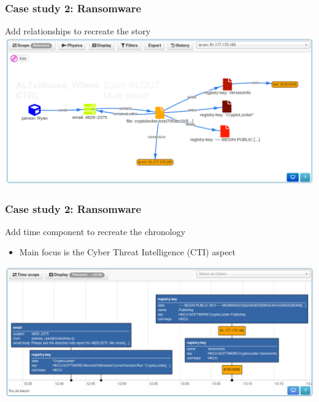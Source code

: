 \begin{frame}
    \frametitle{Case study 2: Ransomware}
    Add relationships to recreate the story
    \includegraphics[width=1.0\linewidth]{pictures/case2/event-graph.png}
\end{frame}

\begin{frame}
    \frametitle{Case study 2: Ransomware}
    Add time component to recreate the chronology
    \begin{itemize}
        \item Main focus is the Cyber Threat Intelligence (CTI) aspect
    \end{itemize}
    \includegraphics[width=1.0\linewidth]{pictures/case2/timeline.png}
\end{frame}


